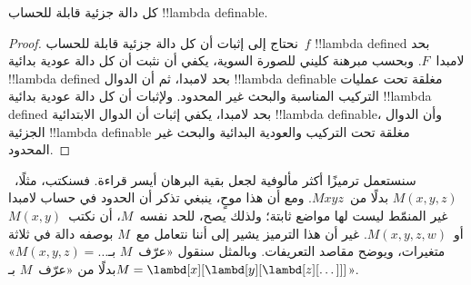 \documentclass[../../../include/open-logic-section]{subfiles}
\begin{document}

\begin{thm}
كل دالة جزئية قابلة للحساب !!{lambda definable}.
\end{thm}

\begin{proof}
نحتاج إلى إثبات أن كل دالة جزئية قابلة للحساب~$f$ !!{lambda defined}
بحد لامبدا~$F$. وبحسب مبرهنة كليني للصورة السوية، يكفي أن نثبت أن كل
دالة عودية بدائية !!{lambda defined} بحد لامبدا، ثم أن الدوال
!!{lambda definable} مغلقة تحت عمليات التركيب المناسبة والبحث غير
المحدود. ولإثبات أن كل دالة عودية بدائية !!{lambda defined} بحد لامبدا،
يكفي إثبات أن الدوال الابتدائية !!{lambda definable}، وأن الدوال الجزئية
!!{lambda definable} مغلقة تحت التركيب والعودية البدائية والبحث غير
المحدود.
\end{proof}

سنستعمل ترميزًا أكثر مألوفية لجعل بقية البرهان أيسر قراءة. فسنكتب،
مثلًا،~$M(x, y, z)$ بدلًا من~$Mxyz$. ومع أن هذا موحٍ، ينبغي تذكر أن
الحدود في حساب لامبدا غير المنمّط ليست لها مواضع ثابتة؛ ولذلك يصح، للحد
نفسه~$M$، أن نكتب~$M(x,y)$ أو~$M(x,y,z,w)$. غير أن هذا الترميز يشير
إلى أننا نتعامل مع~$M$ بوصفه دالة في ثلاثة متغيرات، ويوضح مقاصد
التعريفات. وبالمثل سنقول «عرّف~$M$ بـ$M(x,y,z) = \dots$» بدلًا من
«عرّف~$M$ بـ$M = \lambd[x][\lambd[y][\lambd[z][\dots]]]$».
\end{document}
